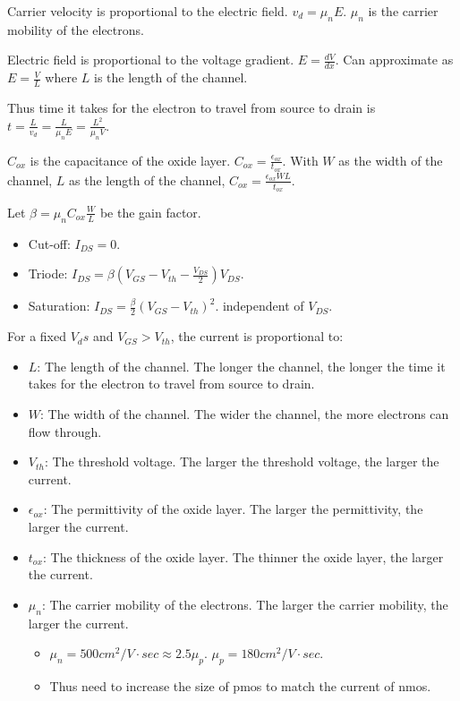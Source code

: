Carrier velocity is proportional to the electric field. $v_d = \mu_n E$. $\mu_n$ is the carrier mobility of the electrons.

Electric field is proportional to the voltage gradient. $E = \frac{dV}{dx}$. Can approximate as $E = \frac{V}{L}$ where $L$ is the length of the channel.

Thus time it takes for the electron to travel from source to drain is $t = \frac{L}{v_d} = \frac{L}{\mu_n E} = \frac{L^2}{\mu_n V}$.

$C_{ox}$ is the capacitance of the oxide layer. $C_{ox} = \frac{\epsilon_{ox}}{t_{ox}}$. With $W$ as the width of the channel, $L$ as the length of the channel, $C_{ox} = \frac{\epsilon_{ox} W L}{t_{ox}}$.

Let $\beta = \mu_n C_{ox} \frac{W}{L}$ be the gain factor. 

\begin{itemize}
    \item Cut-off: $I_{DS} = 0$.
    \item Triode: $I_{DS} = \beta (V_{GS} - V_{th} - \frac{V_{DS}}{2}) V_{DS}$.
    \item Saturation: $I_{DS} = \frac{\beta}{2} (V_{GS} - V_{th})^2$. independent of $V_{DS}$.
\end{itemize}

For a fixed $V_ds$ and $V_{GS} > V_{th}$, the current is proportional to:\begin{itemize}
    \item $L$: The length of the channel. The longer the channel, the longer the time it takes for the electron to travel from source to drain.
    \item $W$: The width of the channel. The wider the channel, the more electrons can flow through.
    \item $V_{th}$: The threshold voltage. The larger the threshold voltage, the larger the current.
    \item $\epsilon_{ox}$: The permittivity of the oxide layer. The larger the permittivity, the larger the current.
    \item $t_{ox}$: The thickness of the oxide layer. The thinner the oxide layer, the larger the current.
    \item $\mu_n$: The carrier mobility of the electrons. The larger the carrier mobility, the larger the current.\begin{itemize}
        \item $\mu_n = 500cm^2/V \cdot sec \approx 2.5 \mu_p$. $\mu_p = 180cm^2/V \cdot sec$.
        \item Thus need to increase the size of pmos to match the current of nmos.
    \end{itemize}
\end{itemize}

